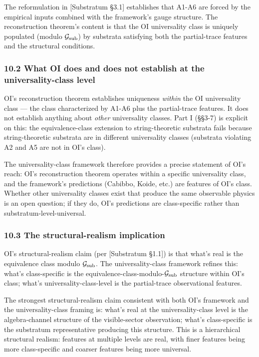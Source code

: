 \documentclass[
]{article}
\begin{document}
The reformulation in {[}Substratum §3.1{]} establishes that A1-A6 are
forced by the empirical inputs combined with the framework's gauge
structure. The reconstruction theorem's content is that the OI
universality class is uniquely populated (modulo
\(\mathcal{G}_{\rm sub}\)) by substrata satisfying both the
partial-trace features and the structural conditions.

\hypertarget{what-oi-does-and-does-not-establish-at-the-universality-class-level}{%
\subsubsection{10.2 What OI does and does not establish at the
universality-class
level}\label{what-oi-does-and-does-not-establish-at-the-universality-class-level}}

OI's reconstruction theorem establishes uniqueness \emph{within} the OI
universality class --- the class characterized by A1-A6 plus the
partial-trace features. It does not establish anything about
\emph{other} universality classes. Part I (§§3-7) is explicit on this:
the equivalence-class extension to string-theoretic substrata fails
because string-theoretic substrata are in different universality classes
(substrata violating A2 and A5 are not in OI's class).

The universality-class framework therefore provides a precise statement
of OI's reach: OI's reconstruction theorem operates within a specific
universality class, and the framework's predictions (Cabibbo, Koide,
etc.) are features of OI's class. Whether other universality classes
exist that produce the same observable physics is an open question; if
they do, OI's predictions are class-specific rather than
substratum-level-universal.

\hypertarget{the-structural-realism-implication}{%
\subsubsection{10.3 The structural-realism
implication}\label{the-structural-realism-implication}}

OI's structural-realism claim (per {[}Substratum §1.1{]}) is that what's
real is the equivalence class modulo \(\mathcal{G}_{\rm sub}\). The
universality-class framework refines this: what's class-specific is the
equivalence-class-modulo-\(\mathcal{G}_{\rm sub}\) structure within OI's
class; what's universality-class-level is the partial-trace
observational features.

The strongest structural-realism claim consistent with both OI's
framework and the universality-class framing is: what's real at the
universality-class level is the algebra-channel structure of the
visible-sector observation; what's class-specific is the substratum
representative producing this structure. This is a hierarchical
structural realism: features at multiple levels are real, with finer
features being more class-specific and coarser features being more
universal.
\end{document}
